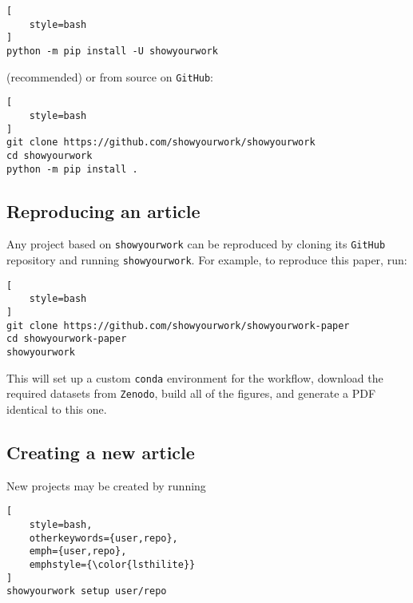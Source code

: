\documentclass[modern]{aastex631}
\newcommand\syw{\texttt{showyourwork}\xspace}
\begin{document}
\noindent\begin{minipage}{\linewidth}
\begin{lstlisting}[
    style=bash
]
python -m pip install -U showyourwork
\end{lstlisting}
\end{minipage}

\noindent (recommended) or from source on \texttt{GitHub}:\\

\noindent\begin{minipage}{\linewidth}
\begin{lstlisting}[
    style=bash
]
git clone https://github.com/showyourwork/showyourwork
cd showyourwork
python -m pip install .
\end{lstlisting}
\end{minipage}

\subsection{Reproducing an article}
\label{sec:usage:reproduce}
Any project based on \syw can be reproduced by cloning its \texttt{GitHub} repository and running \syw. For example, to reproduce this paper, run:\\

\noindent\begin{minipage}{\linewidth}
\begin{lstlisting}[
    style=bash
]
git clone https://github.com/showyourwork/showyourwork-paper
cd showyourwork-paper
showyourwork
\end{lstlisting}
\end{minipage}

\noindent This will set up a custom \texttt{conda} environment for the workflow, download the required datasets from \texttt{Zenodo}, build all of the figures, and generate a PDF identical to this one.

\subsection{Creating a new article}
\label{sec:usage:new}
New projects may be created by running\\

\noindent\begin{minipage}{\linewidth}
\begin{lstlisting}[
    style=bash,
    otherkeywords={user,repo},
    emph={user,repo},
    emphstyle={\color{lsthilite}}
]
showyourwork setup user/repo
\end{lstlisting}
\end{minipage}
\end{document}
